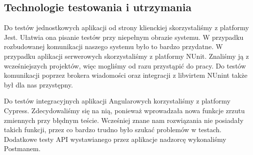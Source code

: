 \documentclass[../opis-rozwiazania.tex]{subfiles}
\begin{document}
\subsection{Technologie testowania i utrzymania}
Do testów jednostkowych aplikacji od strony klienckiej skorzystaliśmy z platformy Jest.
Ułatwia ona pisanie testów przy niepełnym obrazie systemu. W przypadku rozbudowanej komunikacji naszego systemu było to bardzo przydatne.
W przypadku aplikacji serwerowych skorzystaliśmy z platformy NUnit.
Znaliśmy ją z wcześniejszych projektów, więc mogliśmy od razu przystąpić do pracy.
Do testów komunikacji poprzez brokera wiadomości oraz integracji z libvirtem NUnint także był dla nas przystępny.

Do testów integracyjnych aplikacji Angularowych korzystaliśmy z platformy Cypress.
Zdecydowaliśmy się na nią, ponieważ wprowadzała nowa funkcje zrzutu zmiennych przy błędnym teście.
Wcześniej znane nam rozwiązania nie posiadały takich funkcji, przez co bardzo trudno było szukać problemów w testach.
Dodatkowe testy API wystawianego przez aplikacje nadzorcę wykonaliśmy Postmanem.
\end{document}
